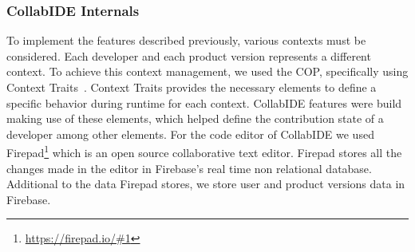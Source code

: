 \subsubsection{CollabIDE Internals}
To implement the features described previously, various contexts must be considered. Each developer 
and each product version represents a different context. To achieve this context management, we used 
the \ac{COP}, specifically using Context Traits~\cite{gonzalez13}. 
Context Traits provides the necessary elements to define a specific behavior during runtime for each 
context. CollabIDE features were build making use of these elements, which helped define the 
contribution state of a developer among other elements.
For the code editor of CollabIDE we used Firepad\footnote{\url{https://firepad.io/\#1}} which is an open 
source collaborative text editor. Firepad stores all the changes made in the editor in Firebase’s real 
time non relational database. Additional to the data Firepad stores, we store user and product versions 
data in Firebase.

\endinput
